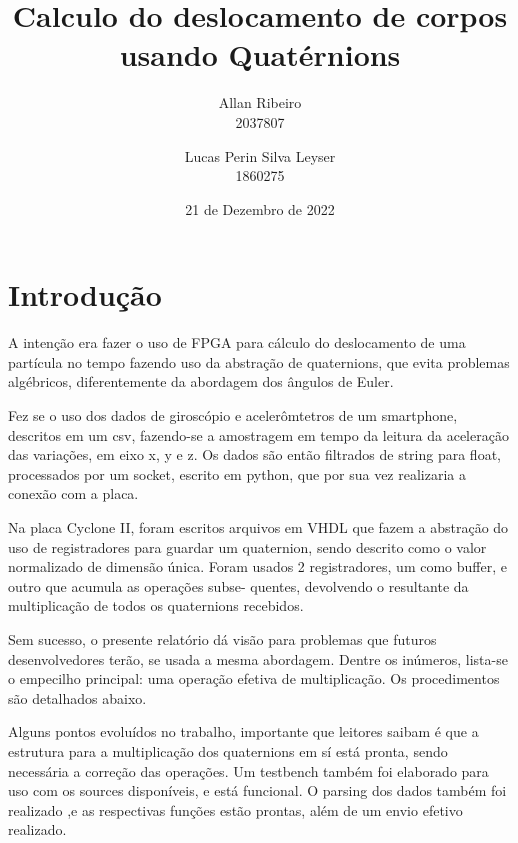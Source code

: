 \documentclass [12pt,oneside] {article}
\begin{document}
\title {Calculo do deslocamento de corpos usando Quatérnions}

\author {
	Allan Ribeiro \\
	2037807 \\
	\and
	Lucas Perin Silva Leyser \\
	1860275
}

\date {21 de Dezembro de 2022}
\maketitle

\section{Introdução}

	A intenção era fazer o uso de FPGA para cálculo do
deslocamento de uma partícula no tempo fazendo uso da abstração de
quaternions, que evita problemas algébricos, diferentemente da
abordagem dos ângulos de Euler.

	Fez se o uso dos dados de giroscópio e acelerômtetros de um
smartphone, descritos em um csv, fazendo-se a amostragem em tempo da
leitura da aceleração das variações, em eixo x, y e z. Os dados são
então filtrados de string para float, processados por um socket,
escrito em python, que por sua vez realizaria a conexão com a placa.

	Na placa Cyclone II, foram escritos arquivos em VHDL que fazem
a abstração do uso de registradores para guardar um quaternion, sendo
descrito como o valor normalizado de dimensão única. Foram usados 2
registradores, um como buffer, e outro que acumula as operações subse-
quentes, devolvendo o resultante da multiplicação de todos os
quaternions recebidos.

	Sem sucesso, o presente relatório dá visão para problemas que
futuros desenvolvedores terão, se usada a mesma abordagem. Dentre os
inúmeros, lista-se o empecilho principal: uma operação efetiva de multiplicação. Os
procedimentos são detalhados abaixo.

	Alguns pontos evoluídos no trabalho, importante que leitores
saibam é que a estrutura para a multiplicação dos quaternions em sí
está pronta, sendo necessária a correção das operações. Um testbench
também foi elaborado para uso com os sources disponíveis, e está
funcional. O parsing dos dados também foi realizado ,e as respectivas
funções estão prontas, além de um envio efetivo realizado.
\end{document}
